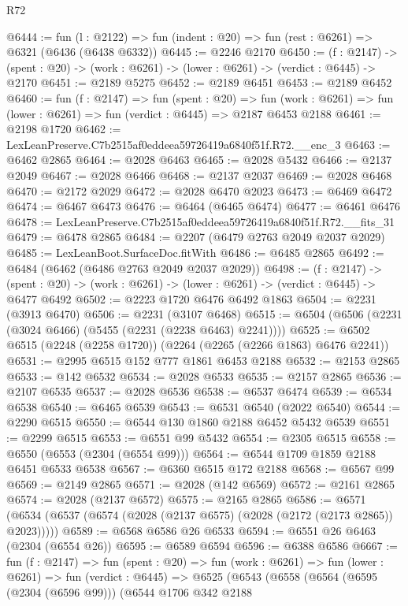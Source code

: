 \begin{lexlean}{R72}
\begin{coremodule}
@6444 := fun (l : @2122) => fun (indent : @20) => fun (rest : @6261) => @6321 (@6436 (@6438 @6332))
@6445 := @2246 @2170
@6450 := (f : @2147) ->
  (spent : @20) -> (work : @6261) -> (lower : @6261) -> (verdict : @6445) -> @2170
@6451 := @2189 @5275
@6452 := @2189 @6451
@6453 := @2189 @6452
@6460 := fun (f : @2147) =>
  fun (spent : @20) =>
  fun (work : @6261) => fun (lower : @6261) => fun (verdict : @6445) => @2187 @6453 @2188
@6461 := @2198 @1720
@6462 := LexLeanPreserve.C7b2515af0eddeea59726419a6840f51f.R72.__enc_3
@6463 := @6462 @2865
@6464 := @2028 @6463
@6465 := @2028 @5432
@6466 := @2137 @2049
@6467 := @2028 @6466
@6468 := @2137 @2037
@6469 := @2028 @6468
@6470 := @2172 @2029
@6472 := @2028 @6470 @2023
@6473 := @6469 @6472
@6474 := @6467 @6473
@6476 := @6464 (@6465 @6474)
@6477 := @6461 @6476
@6478 := LexLeanPreserve.C7b2515af0eddeea59726419a6840f51f.R72.__fits_31
@6479 := @6478 @2865
@6484 := @2207 (@6479 @2763 @2049 @2037 @2029)
@6485 := LexLeanBoot.SurfaceDoc.fitWith
@6486 := @6485 @2865
@6492 := @6484 (@6462 (@6486 @2763 @2049 @2037 @2029))
@6498 := (f : @2147) ->
  (spent : @20) -> (work : @6261) -> (lower : @6261) -> (verdict : @6445) -> @6477 @6492
@6502 := @2223 @1720 @6476 @6492 @1863
@6504 := @2231 (@3913 @6470)
@6506 := @2231 (@3107 @6468)
@6515 := @6504 (@6506 (@2231 (@3024 @6466) (@5455 (@2231 (@2238 @6463) @2241))))
@6525 := @6502 @6515 (@2248 (@2258 @1720)) (@2264 (@2265 (@2266 @1863) @6476 @2241))
@6531 := @2995 @6515 @152 @777 @1861 @6453 @2188
@6532 := @2153 @2865
@6533 := @142 @6532
@6534 := @2028 @6533
@6535 := @2157 @2865
@6536 := @2107 @6535
@6537 := @2028 @6536
@6538 := @6537 @6474
@6539 := @6534 @6538
@6540 := @6465 @6539
@6543 := @6531 @6540 (@2022 @6540)
@6544 := @2290 @6515
@6550 := @6544 @130 @1860 @2188 @6452 @5432 @6539
@6551 := @2299 @6515
@6553 := @6551 @99 @5432
@6554 := @2305 @6515
@6558 := @6550 (@6553 (@2304 (@6554 @99)))
@6564 := @6544 @1709 @1859 @2188 @6451 @6533 @6538
@6567 := @6360 @6515 @172 @2188
@6568 := @6567 @99
@6569 := @2149 @2865
@6571 := @2028 (@142 @6569)
@6572 := @2161 @2865
@6574 := @2028 (@2137 @6572)
@6575 := @2165 @2865
@6586 := @6571 (@6534 (@6537 (@6574 (@2028 (@2137 @6575) (@2028 (@2172 (@2173 @2865)) @2023)))))
@6589 := @6568 @6586 @26 @6533
@6594 := @6551 @26 @6463 (@2304 (@6554 @26))
@6595 := @6589 @6594
@6596 := @6388 @6586
@6667 := fun (f : @2147) =>
  fun (spent : @20) =>
  fun (work : @6261) =>
  fun (lower : @6261) =>
  fun (verdict : @6445) =>
  @6525
    (@6543
      (@6558
        (@6564
          (@6595 (@2304 (@6596 @99)))
          (@6544
            @1706
            @342
            @2188

\end{coremodule}
\end{lexlean}

